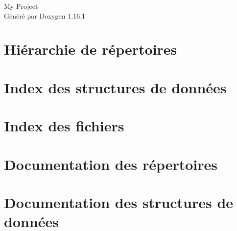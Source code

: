 \documentclass[twoside]{book}
\newcommand{\+}{\discretionary{\mbox{\scriptsize$\hookleftarrow$}}{}{}}
\newcommand{\clearemptydoublepage}{%
    \newpage{\pagestyle{empty}\cleardoublepage}%
  }
\begin{document}
  \raggedbottom
    \hypersetup{pageanchor=false,
                bookmarksnumbered=true,
                pdfencoding=unicode
               }
  \begin{titlepage}
  \vspace*{7cm}
  \begin{center}%
  {\Large My Project}\\
  \vspace*{1cm}
  {\large Généré par Doxygen 1.16.1}\\
  \end{center}
  \end{titlepage}
  \clearemptydoublepage
  \tableofcontents
  \clearemptydoublepage
  \hypersetup{pageanchor=true}

\chapter{Hiérarchie de répertoires}

\chapter{Index des structures de données}

\chapter{Index des fichiers}

\chapter{Documentation des répertoires}







\chapter{Documentation des structures de données}










\end{document}
